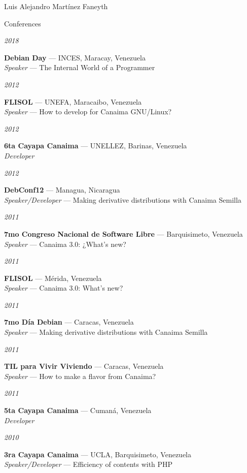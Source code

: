 \documentclass[10pt,letterpaper]{article}
\begin{document}
\begin{cv}{Luis Alejandro Mart\'inez Faneyth}
\begin{cvlist}{Conferences}
\item[{\parbox[t]{6em}{\textit{\large{2018}}}}]{
	\parbox[t]{\linewidth}{
		\textbf{Debian Day} --- INCES, Maracay, Venezuela\\
		\textit{Speaker} --- The Internal World of a Programmer
	}
}
\item[{\parbox[t]{6em}{\textit{\large{2012}}}}]{
	\parbox[t]{\linewidth}{
		\textbf{FLISOL} --- UNEFA, Maracaibo, Venezuela\\
		\textit{Speaker} --- How to develop for Canaima GNU/Linux?
	}
}
\item[{\parbox[t]{6em}{\textit{\large{2012}}}}]{
	\parbox[t]{\linewidth}{
		\textbf{6ta Cayapa Canaima} --- UNELLEZ, Barinas, Venezuela\\
		\textit{Developer}
	}
}
\item[{\parbox[t]{6em}{\textit{\large{2012}}}}]{
	\parbox[t]{\linewidth}{
		\textbf{DebConf12} --- Managua, Nicaragua\\
		\textit{Speaker/Developer} --- Making derivative distributions with Canaima Semilla
	}
}
\item[{\parbox[t]{6em}{\textit{\large{2011}}}}]{
	\parbox[t]{\linewidth}{
		\textbf{7mo Congreso Nacional de Software Libre} --- Barquisimeto, Venezuela\\
		\textit{Speaker} --- Canaima 3.0: ¿What's new?
	}
}
\item[{\parbox[t]{6em}{\textit{\large{2011}}}}]{
	\parbox[t]{\linewidth}{
		\textbf{FLISOL} --- M\'erida, Venezuela\\
		\textit{Speaker} --- Canaima 3.0: What's new?
	}
}
\item[{\parbox[t]{6em}{\textit{\large{2011}}}}]{
	\parbox[t]{\linewidth}{
		\textbf{7mo D\'ia Debian} --- Caracas, Venezuela\\
		\textit{Speaker} --- Making derivative distributions with Canaima Semilla
	}
}
\item[{\parbox[t]{6em}{\textit{\large{2011}}}}]{
	\parbox[t]{\linewidth}{
		\textbf{TIL para Vivir Viviendo} --- Caracas, Venezuela\\
		\textit{Speaker} --- How to make a flavor from Canaima?
	}
}
\item[{\parbox[t]{6em}{\textit{\large{2011}}}}]{
	\parbox[t]{\linewidth}{
		\textbf{5ta Cayapa Canaima} --- Cuman\'a, Venezuela\\
		\textit{Developer}
	}
}
\item[{\parbox[t]{6em}{\textit{\large{2010}}}}]{
	\parbox[t]{\linewidth}{
		\textbf{3ra Cayapa Canaima} --- UCLA, Barquisimeto, Venezuela\\
		\textit{Speaker/Developer} --- Efficiency of contents with PHP
	}
}
\end{cvlist}


\end{cv}
\end{document}
